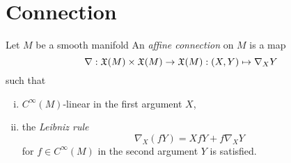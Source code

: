 \documentclass{../note}
\begin{document}
\section{Connection}

\begin{prb}
Let $M$ be a smooth manifold
An \emph{affine connection} on $M$ is a map
\[\nabla:\mathfrak{X}(M)\times\mathfrak{X}(M)\to\mathfrak{X}(M):(X,Y)\mapsto\nabla_XY\]
such that
\begin{enumerate}[(i)]
\item $C^\infty(M)$-linear in the first argument $X$,
\item the \emph{Leibniz rule}
\[\nabla_X(fY)=XfY+f\nabla_XY\]
for $f\in C^\infty(M)$ in the second argument $Y$ is satisfied.
\end{enumerate}
\end{prb}
\end{document}
